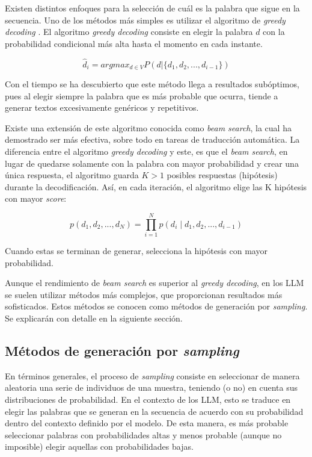 \documentclass[11pt,spanish,listoffigures,listoftables]{tfgetsinf}
\begin{document}
Existen distintos enfoques para la selección de cuál es la palabra que sigue en la secuencia. Uno de los métodos más simples es utilizar el algoritmo de \textit{greedy decoding} \cite{gu2017trainablegreedydecodingneural}. El algoritmo \textit{greedy decoding} consiste en elegir la palabra $d$ con la probabilidad condicional más alta hasta el momento en cada instante.

\begin{equation}
\hat{d}_i = argmax_{d \in V} P(d | \{d_1, d_2, ..., d_{i-1}\})
\end{equation}

Con el tiempo se ha descubierto que este método llega a resultados subóptimos, pues al elegir siempre la palabra que es más probable que ocurra, tiende a generar textos excesivamente genéricos y repetitivos.

Existe una extensión de este algoritmo conocida como \textit{beam search}, la cual ha demostrado ser más efectiva, sobre todo en tareas de traducción automática. La diferencia entre el algoritmo \textit{greedy decoding} y este, es que el \textit{beam search}, en lugar de quedarse solamente con la palabra con mayor probabilidad y crear una única respuesta, el algoritmo guarda $K > 1$ posibles respuestas (hipótesis) durante la decodificación. Así, en cada iteración, el algoritmo elige las K hipótesis con mayor \textit{score}:

\begin{equation}
p(d_1, d_2, ..., d_N) = \prod_{i = 1}^{N} p(d_i \mid d_1, d_2, ..., d_{i-1})
\end{equation}

Cuando estas se terminan de generar, selecciona la hipótesis con mayor probabilidad.

Aunque el rendimiento de \textit{beam search} es superior al \textit{greedy decoding}, en los LLM se suelen utilizar métodos más complejos, que proporcionan resultados más sofisticados. Estos métodos se conocen como métodos de generación por \textit{sampling}. Se explicarán con detalle en la siguiente sección.

\subsection{Métodos de generación por \textit{sampling}}

En términos generales, el proceso de \textit{sampling} consiste en seleccionar de manera aleatoria una serie de individuos de una muestra, teniendo (o no) en cuenta sus distribuciones de probabilidad. En el contexto de los LLM, esto se traduce en elegir las palabras que se generan en la secuencia de acuerdo con su probabilidad dentro del contexto definido por el modelo. De esta manera, es más probable seleccionar palabras con probabilidades altas y menos probable (aunque no imposible) elegir aquellas con probabilidades bajas.
\end{document}
